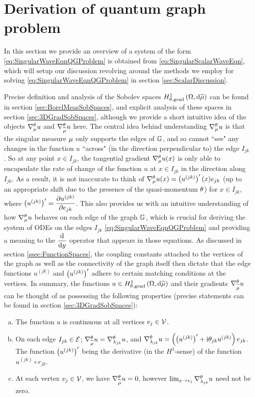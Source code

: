 \section{Derivation of quantum graph problem} \label{sec:ScalarDerivation}
In this section we provide an overview of a system of the form \eqref{eq:SingularWaveEqnQGProblem} is obtained from \eqref{eq:SingularScalarWaveEqn}, which will setup our discussion revolving around the methods we employ for solving \eqref{eq:SingularWaveEqnQGProblem} in section \ref{sec:ScalarDiscussion}.

Precise definition and analysis of the Sobolev spaces $H^1_{\theta, \mathrm{grad}}\left( \Omega, \mathrm{d}\widetilde{\mu} \right)$ can be found in section \ref{sec:BorelMeasSobSpaces}, and explicit analysis of these spaces in section \ref{sec:3DGradSobSpaces}, although we provide a short intuitive idea of the objects $\nabla^{\theta}_{\mu}u$ and $\nabla^{\theta}_{\widetilde{\mu}}u$ here.
The central idea behind understanding $\nabla^{\theta}_{\mu}u$ is that the singular measure $\mu$ only supports the edges of $\mathbb{G}$, and so cannot ``see" any changes in the function $u$ ``across" (in the direction perpendicular to) the edge $I_{jk}$.
So at any point $x\in I_{jk}$, the tangential gradient $\nabla^{\theta}_{\mu}u(x)$ is only able to encapsulate the rate of change of the function $u$ at $x\in I_{jk}$ in the direction along $I_{jk}$.
As a result, it is not inaccurate to think of $\nabla^{\theta}_{\mu}u(x) = \left( u^{(jk)} \right)'(x)e_{jk}$ (up to an appropriate shift due to the presence of the quasi-momentum $\theta$) for $x\in I_{jk}$, where $\left( u^{(jk)} \right)' = \dfrac{\partial u^{(jk)}}{\partial e_{jk}}$.
This also provides us with an intuitive understanding of how $\nabla^{\theta}_{\mu}u$ behaves on each edge of the graph $\mathbb{G}$, which is crucial for deriving the system of ODEs on the edges $I_{jk}$ \eqref{eq:SingularWaveEqnQGProblem} and providing a meaning to the $\dfrac{\mathrm{d}}{\mathrm{d}y}$ operator that appears in those equations.
As discussed in section \ref{ssec:FunctionSpaces}, the coupling constants attached to the vertices of the graph as well as the connectivity of the graph itself then dictate that the edge functions $u^{(jk)}$ and $\left( u^{(jk)} \right)'$ adhere to certain matching conditions at the vertices.
In summary, the functions $u\in H^1_{\theta, \mathrm{grad}}\left( \Omega, \mathrm{d}\widetilde{\mu} \right)$ and their gradients $\nabla^{\theta}_{\widetilde{\mu}}u$ can be thought of as possessing the following properties (precise statements can be found in section \ref{sec:3DGradSobSpaces}):
\begin{enumerate}[(a)]
	\item The function $u$ is continuous at all vertices $v_j\in\mathcal{V}$.
	\item On each edge $I_{jk}\in\mathcal{E}$; $\nabla^{\theta}_{\widetilde{\mu}}u = \nabla^{\theta}_{\lambda_{jk}}u$, and $\nabla^{\theta}_{\lambda_{jk}}u = \left( \left( u^{(jk)} \right)' + \mathrm{i}\theta_{jk}u^{(jk)} \right)e_{jk}$.
	The function $\left( u^{(jk)} \right)'$ being the derivative (in the $H^1$-sense) of the function $u^{(jk)}\circ r_{jk}$.
	\item At each vertex $v_j\in\mathcal{V}$, we have $\nabla^{\theta}_{\widetilde{\mu}}u=0$, however $\lim_{x\rightarrow v_j}\nabla^{\theta}_{\lambda_{jk}}u$ need not be zero.
\end{enumerate}

